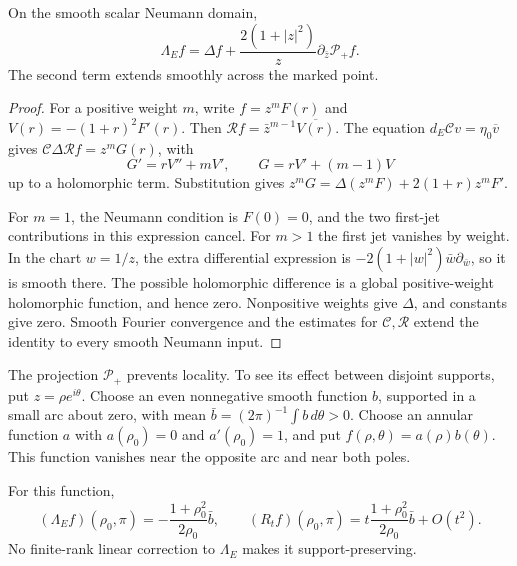 \begin{proposition}\label{mht:prop:heat-generator}
On the smooth scalar Neumann domain,
\begin{equation}\label{mht:eq:heat-generator}
 \Lambda_Ef=\Delta f+
   \frac{2(1+|z|^2)}{z}\partial_{\bar z}\mathcal P_+f.
\end{equation}
The second term extends smoothly across the marked point.
\end{proposition}

\begin{proof}
For a positive weight $m$, write $f=z^mF(r)$ and
$V(r)=-(1+r)^2F'(r)$. Then
$\mathcal Rf=\bar z^{m-1}\overline{V(r)}$. The equation
$d_E\mathcal Cv=\eta_0\overline v$ gives
$\mathcal C\Delta\mathcal Rf=z^mG(r)$, with
\[
 G'=rV''+mV',\qquad G=rV'+(m-1)V
\]
up to a holomorphic term. Substitution gives
$z^mG=\Delta(z^mF)+2(1+r)z^mF'$.

For $m=1$, the Neumann condition is $F(0)=0$, and the two
first-jet contributions in this expression cancel. For $m>1$
the first jet vanishes by weight. In the chart $w=1/z$, the
extra differential expression is
$-2(1+|w|^2)\bar w\partial_{\bar w}$, so it is smooth there.
The possible holomorphic difference is a global positive-weight
holomorphic function, and hence zero. Nonpositive weights give
$\Delta$, and constants give zero. Smooth Fourier convergence
and the estimates for $\mathcal C,\mathcal R$ extend the identity
to every smooth Neumann input.
\end{proof}

The projection $\mathcal P_+$ prevents locality. To see its
effect between disjoint supports, put $z=\rho e^{i\theta}$.
Choose an even nonnegative smooth function $b$, supported in a
small arc about zero, with mean
$\bar b=(2\pi)^{-1}\int b\,d\theta>0$. Choose an annular
function $a$ with $a(\rho_0)=0$ and $a'(\rho_0)=1$, and put
$f(\rho,\theta)=a(\rho)b(\theta)$. This function vanishes near
the opposite arc and near both poles.

\begin{proposition}\label{mht:prop:heat-nonlocal}
For this function,
\begin{equation}\label{mht:eq:heat-disjoint-response}
 (\Lambda_Ef)(\rho_0,\pi)
   =-\frac{1+\rho_0^2}{2\rho_0}\bar b,
 \qquad
 (R_tf)(\rho_0,\pi)
   =t\frac{1+\rho_0^2}{2\rho_0}\bar b+O(t^2).
\end{equation}
No finite-rank linear correction to $\Lambda_E$ makes it
support-preserving.
\end{proposition}

